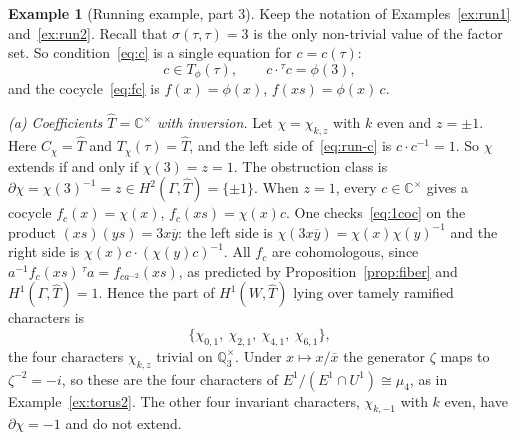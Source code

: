 \documentclass[12pt,letterpaper]{article}
\numberwithin{equation}{section}
\theoremstyle{plain}
\theoremstyle{definition}
\newtheorem{example}[theorem]{Example}
\newcommand{\C}{\mathbb{C}}
\newcommand{\Q}{\mathbb{Q}}
\newcommand{\Th}{\widehat{T}}
\newcommand{\act}[2]{{}^{#1}\!#2}          %
\begin{document}
\begin{example}[Running example, part 3]\label{ex:run3}
Keep the notation of Examples~\ref{ex:run1} and~\ref{ex:run2}. Recall
that $\sigma(\tau,\tau)=3$ is the only non-trivial value of the factor
set. So condition~\eqref{eq:c} is a single equation for $c=c(\tau)$:
\begin{equation}\label{eq:run-c}
c\in T_\phi(\tau),\qquad c\cdot\act{\tau}{c}=\phi(3),
\end{equation}
and the cocycle~\eqref{eq:fc} is $f(x)=\phi(x)$, $f(xs)=\phi(x)\,c$.

\smallskip\noindent\emph{(a) Coefficients $\Th=\C^\times$ with inversion.}
Let $\chi=\chi_{k,z}$ with $k$ even and $z=\pm1$. Here $C_\chi=\Th$ and
$T_\chi(\tau)=\Th$, and the left side of~\eqref{eq:run-c} is
$c\cdot c^{-1}=1$. So $\chi$ extends if and only if $\chi(3)=z=1$. The
obstruction class is
$\partial\chi=\chi(3)^{-1}=z\in H^2(\Gamma,\Th)=\{\pm1\}$. When $z=1$,
every $c\in\C^\times$ gives a cocycle $f_c(x)=\chi(x)$,
$f_c(xs)=\chi(x)c$. One checks~\eqref{eq:1coc} on the product
$(xs)(ys)=3x\overline{y}$: the left side is $\chi(3x\overline{y})
=\chi(x)\chi(y)^{-1}$ and the right side is
$\chi(x)c\cdot(\chi(y)c)^{-1}$. All $f_c$ are cohomologous, since
$a^{-1}f_c(xs)\,\act{\tau}{a}=f_{ca^{-2}}(xs)$, as predicted by
Proposition~\ref{prop:fiber} and $H^1(\Gamma,\Th)=1$. Hence the part of
$H^1(W,\Th)$ lying over tamely ramified characters is
\[
\{\chi_{0,1},\ \chi_{2,1},\ \chi_{4,1},\ \chi_{6,1}\},
\]
the four characters $\chi_{k,z}$ trivial on $\Q_3^\times$. Under
$x\mapsto x/\overline{x}$ the generator $\zeta$ maps to
$\zeta^{-2}=-i$, so these are the four characters of
$E^1/(E^1\cap U^1)\cong\mu_4$, as in Example~\ref{ex:torus2}. The other
four invariant characters, $\chi_{k,-1}$ with $k$ even, have
$\partial\chi=-1$ and do not extend.


\end{example}
\end{document}

